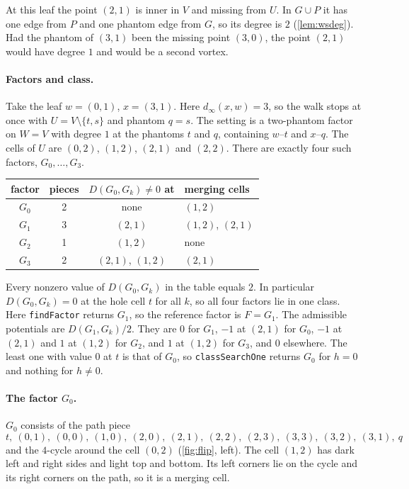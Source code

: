 \documentclass[11pt]{article}
\theoremstyle{plain}
\theoremstyle{definition}
\theoremstyle{remark}
\newcommand{\lean}[1]{\texttt{#1}}
\newcommand{\dist}{d_\infty}
\begin{document}
At this leaf the point $(2,1)$ is inner in $V$ and missing from $U$.
In $G\cup P$ it has one edge from $P$ and one phantom edge from $G$, so its degree is $2$
(\cref{lem:wsdeg}).
Had the phantom of $(3,1)$ been the missing point $(3,0)$, the point $(2,1)$ would have degree $1$ and
would be a second vortex.

\paragraph{Factors and class.}
Take the leaf $w=(0,1)$, $x=(3,1)$.
Here $\dist(x,w)=3$, so the walk stops at once with $U=V\setminus\{t,s\}$ and phantom $q=s$.
The setting is a two-phantom factor on $W=V$ with degree $1$ at the phantoms $t$ and $q$, containing
$w$--$t$ and $x$--$q$.
The cells of $U$ are $(0,2)$, $(1,2)$, $(2,1)$ and $(2,2)$.
There are exactly four such factors, $G_0,\dots,G_3$.
\begin{center}
\begin{tabular}{@{}cccl@{}}
\toprule
factor & pieces & $D(G_0,G_k)\ne0$ at & merging cells \\
\midrule
$G_0$ & 2 & none & $(1,2)$ \\
$G_1$ & 3 & $(2,1)$ & $(1,2)$, $(2,1)$ \\
$G_2$ & 1 & $(1,2)$ & none \\
$G_3$ & 2 & $(2,1)$, $(1,2)$ & $(2,1)$ \\
\bottomrule
\end{tabular}
\end{center}
Every nonzero value of $D(G_0,G_k)$ in the table equals $2$.
In particular $D(G_0,G_k)=0$ at the hole cell $t$ for all $k$, so all four factors lie in one class.
Here \lean{findFactor} returns $G_1$, so the reference factor is $F=G_1$.
The admissible potentials are $D(G_1,G_k)/2$.
They are $0$ for $G_1$, $-1$ at $(2,1)$ for $G_0$, $-1$ at $(2,1)$ and $1$ at $(1,2)$ for $G_2$, and
$1$ at $(1,2)$ for $G_3$, and $0$ elsewhere.
The least one with value $0$ at $t$ is that of $G_0$, so \lean{classSearchOne} returns $G_0$ for $h=0$ and
nothing for $h\ne0$.

\paragraph{The factor $G_0$.}
$G_0$ consists of the path piece
\[t,\ (0,1),\ (0,0),\ (1,0),\ (2,0),\ (2,1),\ (2,2),\ (2,3),\ (3,3),\ (3,2),\ (3,1),\ q\]
and the $4$-cycle around the cell $(0,2)$ (\cref{fig:flip}, left).
The cell $(1,2)$ has dark left and right sides and light top and bottom.
Its left corners lie on the cycle and its right corners on the path, so it is a merging cell.
\end{document}
